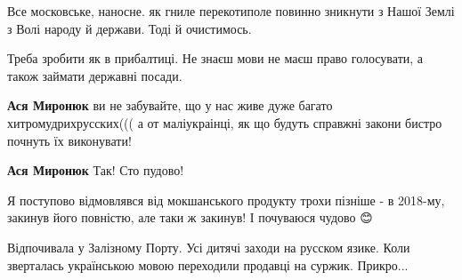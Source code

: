\begin{itemize}
Все московське, наносне. як гниле перекотиполе повинно зникнути з Нашої Землі з Волі народу й держави. Тоді й очистимось.

\begin{itemize}
 
Треба зробити як в прибалтиці. Не знаєш мови не маєш право голосувати, а також займати державні посади.

 
\textbf{Ася Миронюк} 
ви не забувайте, що у нас живе дуже багато хитромудрихрусских((( а от маліукраінці, як що будуть справжні закони бистро почнуть їх виконувати!

 
\textbf{Ася Миронюк} Так! Сто пудово!
\end{itemize}

 
Я поступово відмовлявся від мокшанського продукту трохи пізніше - в 2018-му, закинув його повністю, але таки ж закинув! І почуваюся чудово 😊

 
Відпочивала у Залізному Порту. Усі дитячі заходи на русском язике. Коли зверталась українською мовою переходили продавці на суржик. Прикро...

\begin{itemize}
 

\end{itemize}
\end{itemize}
